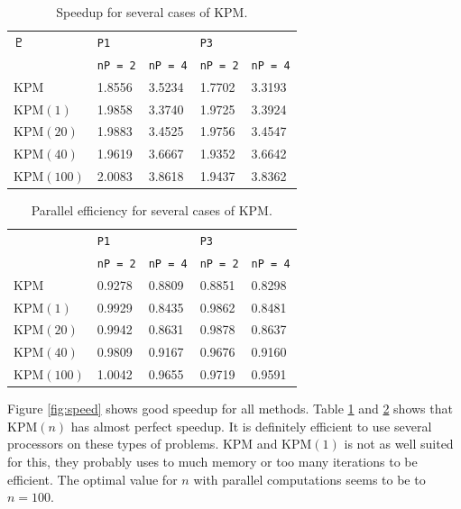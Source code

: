 \begin{table}[H]
\centering
\begin{tabular}{l| l l | l l}
$\Pluto$
 &\texttt{P1} & & \texttt{P3} & \\
&\texttt{nP = 2} & \texttt{nP = 4} & \texttt{nP = 2} & \texttt{nP = 4} \\
\hline
KPM & 1.8556  &  3.5234 & 1.7702&    3.3193\\
KPM$(1)$ & 1.9858  &  3.3740 & 1.9725&    3.3924\\
KPM$(20)$ & 1.9883  &  3.4525 & 1.9756&    3.4547\\
KPM$(40)$ & 1.9619  &  3.6667 & 1.9352&   3.6642\\
KPM$(100)$ & 2.0083  &  3.8618 & 1.9437&    3.8362\\
\end{tabular}
\caption{Speedup for several cases of KPM.}
\label{tab:speedup}
\end{table}

\begin{table}[H]
\centering
\begin{tabular}{l|l l| l l}
&\texttt{P1} & & \texttt{P3} & \\
&\texttt{nP = 2} & \texttt{nP = 4} & \texttt{nP = 2} & \texttt{nP = 4} \\
\hline
KPM & 0.9278  &  0.8809 & 0.8851&    0.8298\\
KPM$(1)$ &  0.9929  &  0.8435 & 0.9862 &   0.8481\\
KPM$(20)$ & 0.9942  &  0.8631 & 0.9878&    0.8637\\
KPM$(40)$ & 0.9809  &  0.9167 & 0.9676&    0.9160\\
KPM$(100)$ & 1.0042  &  0.9655 & 0.9719&    0.9591\\
\end{tabular}
\caption{Parallel efficiency for several cases of KPM. }
\label{tab:eff}
\end{table}
Figure \ref{fig:speed} shows good speedup for all methods. Table \ref{tab:speedup} and \ref{tab:eff} shows that KPM$(n)$ has almost perfect speedup. It is definitely efficient to use several processors on these types of problems. KPM and KPM$(1)$ is not as well suited for this, they probably uses to much memory or too many iterations to be efficient. The optimal value for $n$ with parallel computations seems to be to $n = 100$.

